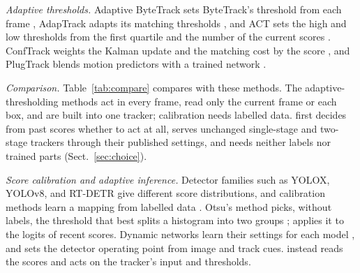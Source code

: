 \emph{Adaptive thresholds.} Adaptive ByteTrack sets ByteTrack's threshold from each frame
\cite{ma2023adaptivebytetrack}, AdapTrack adapts its matching thresholds \cite{shim2024adaptrack},
and ACT sets the high and low thresholds from the first quartile and the number of the current
scores \cite{act2026adaptive}. ConfTrack weights the Kalman update and the matching cost by the
score \cite{jung2024conftrack}, and PlugTrack blends motion predictors with a trained network
\cite{kim2026plugtrack}.

\emph{Comparison.} Table~\ref{tab:compare} compares \scl{} with these methods. The
adaptive-thresholding methods act in every frame, read only the current frame or each box, and are
built into one tracker; calibration needs labelled data. \scl{} first decides from past scores
whether to act at all, serves unchanged single-stage and two-stage trackers through their published
settings, and needs neither labels nor trained parts (Sect.~\ref{sec:choice}).




\emph{Score calibration and adaptive inference.} Detector families such as YOLOX, YOLOv8, and
RT-DETR give different score distributions, and calibration methods learn a mapping from labelled
data \cite{kuppers2020detcalib}. Otsu's method picks, without labels, the threshold that best splits a
histogram into two groups \cite{goh2018otsu}; \scl{} applies it to the logits of recent scores. Dynamic
networks learn their settings for each model \cite{han2022dynamic}, and \priorctl{}
sets the detector operating point from image and track cues. \scl{} instead
reads the scores and acts on the tracker's input and thresholds.
